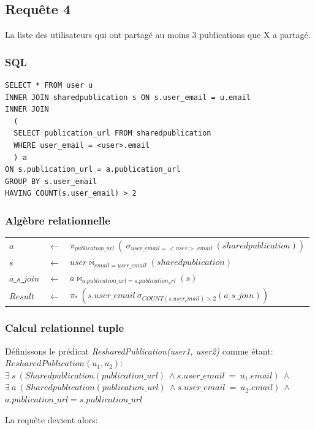 \documentclass[a4paper,10pt]{article}
\begin{document}
\subsection{Requête 4}
La liste des utilisateurs qui ont partagé au moins 3 publications que X a partagé.
\subsubsection{SQL}
\begin{lstlisting}
SELECT * FROM user u
INNER JOIN sharedpublication s ON s.user_email = u.email
INNER JOIN 
  (
  SELECT publication_url FROM sharedpublication 
  WHERE user_email = <user>.email
  ) a
ON s.publication_url = a.publication_url
GROUP BY s.user_email
HAVING COUNT(s.user_email) > 2
\end{lstlisting}
\subsubsection{Algèbre relationnelle}
\begin{center}
\begin{tabular}{lll}
$a$		& $\leftarrow$ & $\pi_{publication\_url}\ (\ \sigma_{user\_email=<user>.email}\ (sharedpublication))$\\
$s$		& $\leftarrow$ & $user \Join_{email = user\_email} (sharedpublication)$\\
$a\_s\_join$	& $\leftarrow$ & $a \Join_{a.publication\_url=s.publication_url} (s)$\\
$Result$	& $\leftarrow$ & $\pi_*\ (s.user\_email\ \sigma_{COUNT(s.user_email) > 2} (a\_s\_join))$
\end{tabular}
\end{center}

\subsubsection{Calcul relationnel tuple}
Définissons le prédicat \emph{ResharedPublication(user1, user2)} comme étant:
\\
      $ResharedPublication(u_1, u_2):\ $\\
	  $\exists\ s\ (Sharedpublication(publication\_url)\ \wedge s.user\_email\ =\ u_1.email)\ \wedge $\\
	  $\exists\ a\ (Sharedpublication(publication\_url)\ \wedge s.user\_email\ =\ u_2.email)\ \wedge $\\
	  $a.publication\_url = s.publication\_url$

La requête devient alors:
\end{document}
